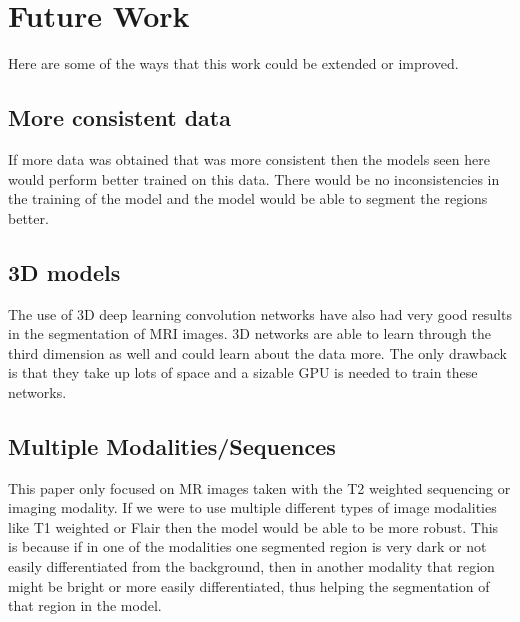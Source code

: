 \section{Future Work}
    Here are some of the ways that this work could be extended or improved.
    
\subsection{More consistent data}
    If more data was obtained that was more consistent then the models seen here would perform better trained on this data.
    There would be no inconsistencies in the training of the model and the model would be able to segment the regions better.
    
\subsection{3D models}
    The use of 3D deep learning convolution networks have also had very good results in the segmentation of MRI images. 
    3D networks are able to learn through the third dimension as well and could learn about the data more.
    The only drawback is that they take up lots of space and a sizable GPU is needed to train these networks.
    
\subsection{Multiple Modalities/Sequences}
    This paper only focused on MR images taken with the T2 weighted sequencing or imaging modality.
    If we were to use multiple different types of image modalities like T1 weighted or Flair then the model would be able to be more robust.
    This is because if in one of the modalities one segmented region is very dark or not easily differentiated from the background, then in another modality that region might be bright or more easily differentiated, thus helping the segmentation of that region in the model.